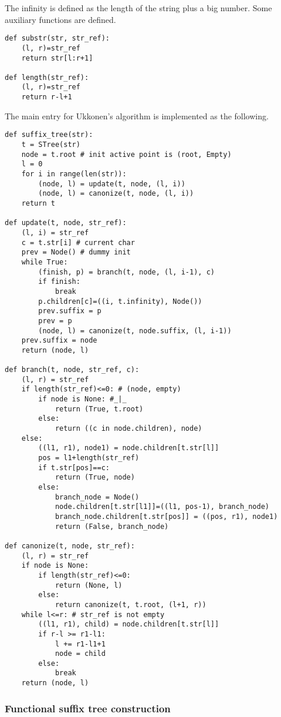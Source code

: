 \documentclass{article}
\begin{document}
The infinity is defined as the length of the string plus a big number.
Some auxiliary functions are defined.

\begin{lstlisting}
def substr(str, str_ref):
    (l, r)=str_ref
    return str[l:r+1]

def length(str_ref):
    (l, r)=str_ref
    return r-l+1
\end{lstlisting}

The main entry for Ukkonen's algorithm is implemented as the following.

\begin{lstlisting}
def suffix_tree(str):
    t = STree(str)
    node = t.root # init active point is (root, Empty)
    l = 0
    for i in range(len(str)):
        (node, l) = update(t, node, (l, i))
        (node, l) = canonize(t, node, (l, i))
    return t

def update(t, node, str_ref):
    (l, i) = str_ref
    c = t.str[i] # current char
    prev = Node() # dummy init
    while True:
        (finish, p) = branch(t, node, (l, i-1), c)
        if finish:
            break
        p.children[c]=((i, t.infinity), Node())
        prev.suffix = p
        prev = p
        (node, l) = canonize(t, node.suffix, (l, i-1))
    prev.suffix = node
    return (node, l)

def branch(t, node, str_ref, c):
    (l, r) = str_ref
    if length(str_ref)<=0: # (node, empty)
        if node is None: #_|_
            return (True, t.root)
        else:
            return ((c in node.children), node)
    else:
        ((l1, r1), node1) = node.children[t.str[l]]
        pos = l1+length(str_ref)
        if t.str[pos]==c:
            return (True, node)
        else:
            branch_node = Node()
            node.children[t.str[l1]]=((l1, pos-1), branch_node)
            branch_node.children[t.str[pos]] = ((pos, r1), node1)
            return (False, branch_node)

def canonize(t, node, str_ref):
    (l, r) = str_ref
    if node is None:
        if length(str_ref)<=0:
            return (None, l)
        else:
            return canonize(t, t.root, (l+1, r))
    while l<=r: # str_ref is not empty
        ((l1, r1), child) = node.children[t.str[l]]
        if r-l >= r1-l1:
            l += r1-l1+1
            node = child
        else:
            break
    return (node, l)
\end{lstlisting}

\subsubsection{Functional suffix tree construction}
\end{document}
